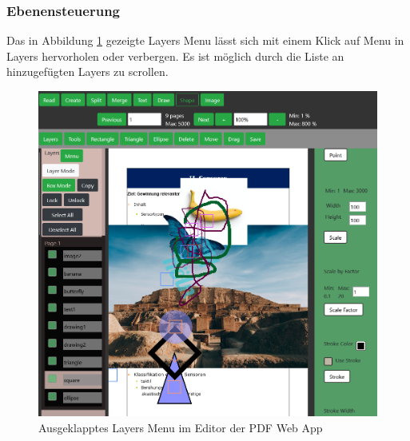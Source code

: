 \subsubsection{Ebenensteuerung}
Das in Abbildung \ref{fig:ebenenmenu} gezeigte Layers Menu lässt sich mit einem Klick auf Menu in Layers hervorholen oder verbergen. Es ist möglich durch die Liste an hinzugefügten Layers zu scrollen.

\begin{figure}[!htbp]
	\centering
	\includegraphics[width=1\textwidth]{"images/ebenenmenu.png"}
	\caption{Ausgeklapptes Layers Menu im Editor der PDF Web App}
	\label{fig:ebenenmenu}
\end{figure}

